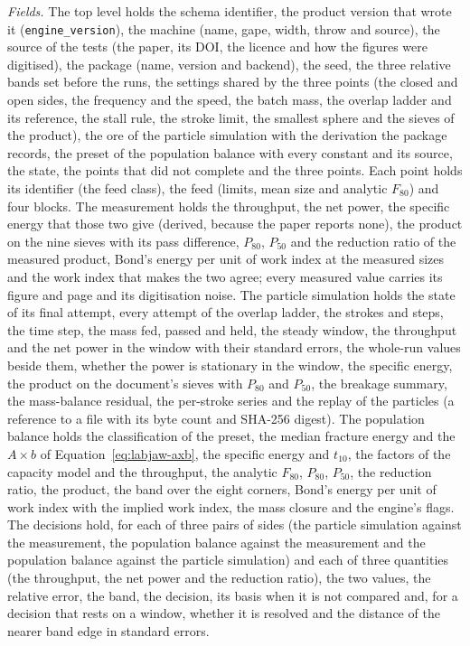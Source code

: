 \emph{Fields.} The top level holds the schema identifier, the product version that wrote it (\texttt{engine\_version}), the machine (name, gape, width, throw and source), the source of the tests (the paper, its DOI, the licence and how the figures were digitised), the package (name, version and backend), the seed, the three relative bands set before the runs, the settings shared by the three points (the closed and open sides, the frequency and the speed, the batch mass, the overlap ladder and its reference, the stall rule, the stroke limit, the smallest sphere and the sieves of the product), the ore of the particle simulation with the derivation the package records, the preset of the population balance with every constant and its source, the state, the points that did not complete and the three points. Each point holds its identifier (the feed class), the feed (limits, mean size and analytic $F_{80}$) and four blocks. The measurement holds the throughput, the net power, the specific energy that those two give (derived, because the paper reports none), the product on the nine sieves with its pass difference, $P_{80}$, $P_{50}$ and the reduction ratio of the measured product, Bond's energy per unit of work index at the measured sizes and the work index that makes the two agree; every measured value carries its figure and page and its digitisation noise. The particle simulation holds the state of its final attempt, every attempt of the overlap ladder, the strokes and steps, the time step, the mass fed, passed and held, the steady window, the throughput and the net power in the window with their standard errors, the whole-run values beside them, whether the power is stationary in the window, the specific energy, the product on the document's sieves with $P_{80}$ and $P_{50}$, the breakage summary, the mass-balance residual, the per-stroke series and the replay of the particles (a reference to a file with its byte count and SHA-256 digest). The population balance holds the classification of the preset, the median fracture energy and the $A\times b$ of Equation~\eqref{eq:labjaw-axb}, the specific energy and $t_{10}$, the factors of the capacity model and the throughput, the analytic $F_{80}$, $P_{80}$, $P_{50}$, the reduction ratio, the product, the band over the eight corners, Bond's energy per unit of work index with the implied work index, the mass closure and the engine's flags. The decisions hold, for each of three pairs of sides (the particle simulation against the measurement, the population balance against the measurement and the population balance against the particle simulation) and each of three quantities (the throughput, the net power and the reduction ratio), the two values, the relative error, the band, the decision, its basis when it is not compared and, for a decision that rests on a window, whether it is resolved and the distance of the nearer band edge in standard errors.

